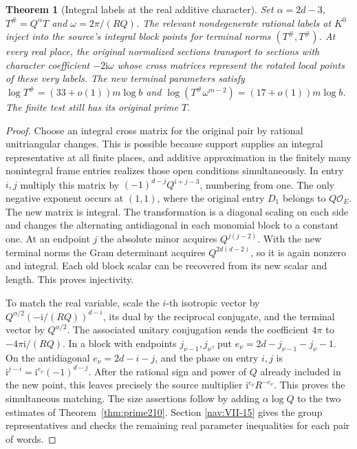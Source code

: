 \documentclass[a4paper,11pt]{article}
\newtheorem{theorem}[proposition]{Theorem}
\theoremstyle{definition}
\theoremstyle{remark}
\numberwithin{equation}{section}
\begin{document}
\begin{theorem}[Integral labels at the real additive character]
\label{thm:match210}
Set \(\alpha=2d-3\), \(T^\#=Q^\alpha T\) and \(\omega=2\pi/(RQ)\).
The relevant nondegenerate rational labels at \(K^0\) inject into
the source's integral block points for terminal norms
\((T^\#,T^\#)\). At every real place, the original normalized
sections transport to sections with character coefficient
\(-2\mathrm i\omega\) whose cross matrices represent the rotated
local points of these very labels.
The new terminal parameters satisfy
\(\log T^\#=(33+o(1))m\log b\) and
\(\log(T^\#\omega^{m-2})=(17+o(1))m\log b\).
The finite test still has its original prime \(T\).
\end{theorem}
\begin{proof}
Choose an integral cross matrix for the original pair by rational
unitriangular changes. This is possible because support supplies
an integral representative at all finite places, and additive
approximation in the finitely many nonintegral frame entries
realizes those open conditions simultaneously.
In entry \(i,j\) multiply this matrix by
\((-1)^{d-j}Q^{i+j-3}\), numbering from one.
The only negative exponent occurs at \((1,1)\), where the
original entry \(D_1\) belongs to \(Q\mathcal O_E\).
The new matrix is integral. The transformation is a diagonal
scaling on each side and changes the alternating antidiagonal
in each monomial block to a constant one. At an endpoint \(j\)
the absolute minor acquires \(Q^{j(j-2)}\). With the new terminal
norms the Gram determinant acquires \(Q^{2d(d-2)}\), so it is
again nonzero and integral. Each old block scalar can be recovered
from its new scalar and length. This proves injectivity.

To match the real variable, scale the \(i\)-th isotropic vector
by \(Q^{\alpha/2}(-\mathrm i/(RQ))^{d-i}\), its dual by the
reciprocal conjugate, and the terminal vector by \(Q^{\alpha/2}\).
The associated unitary conjugation sends the coefficient \(4\pi\)
to \(-4\pi\mathrm i/(RQ)\). In a block with endpoints
\(j_{\nu-1},j_\nu\), put \(e_\nu=2d-j_{\nu-1}-j_\nu-1\).
On the antidiagonal \(e_\nu=2d-i-j\), and the phase on entry
\(i,j\) is \(\mathrm i^{j-i}=\mathrm i^{e_\nu}(-1)^{d-j}\).
After the rational sign and power of \(Q\) already included in
the new point, this leaves precisely the source multiplier
\(\mathrm i^{e_\nu}R^{-e_\nu}\). This proves the simultaneous
matching. The size assertions follow by adding \(\alpha\log Q\)
to the two estimates of Theorem~\ref{thm:prime210}.
Section \ref{nav:VII-15}
gives the group representatives and checks the remaining real
parameter inequalities for each pair of words.
\end{proof}
\end{document}
